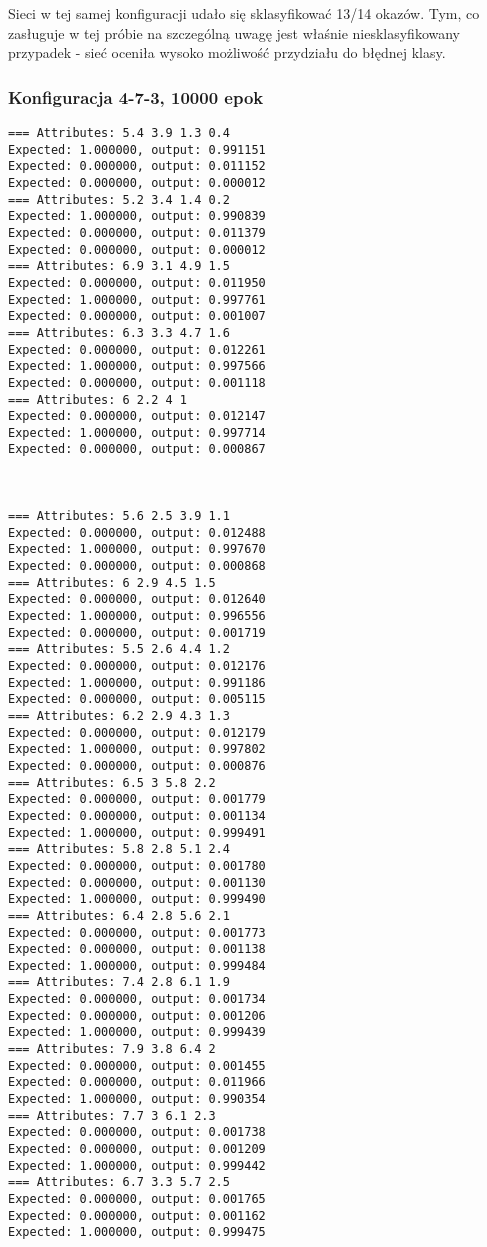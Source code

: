 \documentclass{classrep}
\begin{document}
Sieci w tej samej konfiguracji udało się sklasyfikować 13/14 okazów. Tym, co zasługuje w tej próbie na szczególną uwagę jest właśnie niesklasyfikowany przypadek - sieć oceniła wysoko możliwość przydziału do błędnej klasy.

\subsubsection{Konfiguracja 4-7-3, 10000 epok}
\begin{lstlisting}[basicstyle=\small]
=== Attributes: 5.4 3.9 1.3 0.4 
Expected: 1.000000, output: 0.991151
Expected: 0.000000, output: 0.011152
Expected: 0.000000, output: 0.000012
=== Attributes: 5.2 3.4 1.4 0.2 
Expected: 1.000000, output: 0.990839
Expected: 0.000000, output: 0.011379
Expected: 0.000000, output: 0.000012
=== Attributes: 6.9 3.1 4.9 1.5 
Expected: 0.000000, output: 0.011950
Expected: 1.000000, output: 0.997761
Expected: 0.000000, output: 0.001007
=== Attributes: 6.3 3.3 4.7 1.6 
Expected: 0.000000, output: 0.012261
Expected: 1.000000, output: 0.997566
Expected: 0.000000, output: 0.001118
=== Attributes: 6 2.2 4 1 
Expected: 0.000000, output: 0.012147
Expected: 1.000000, output: 0.997714
Expected: 0.000000, output: 0.000867



=== Attributes: 5.6 2.5 3.9 1.1 
Expected: 0.000000, output: 0.012488
Expected: 1.000000, output: 0.997670
Expected: 0.000000, output: 0.000868
=== Attributes: 6 2.9 4.5 1.5 
Expected: 0.000000, output: 0.012640
Expected: 1.000000, output: 0.996556
Expected: 0.000000, output: 0.001719
=== Attributes: 5.5 2.6 4.4 1.2 
Expected: 0.000000, output: 0.012176
Expected: 1.000000, output: 0.991186
Expected: 0.000000, output: 0.005115
=== Attributes: 6.2 2.9 4.3 1.3 
Expected: 0.000000, output: 0.012179
Expected: 1.000000, output: 0.997802
Expected: 0.000000, output: 0.000876
=== Attributes: 6.5 3 5.8 2.2 
Expected: 0.000000, output: 0.001779
Expected: 0.000000, output: 0.001134
Expected: 1.000000, output: 0.999491
=== Attributes: 5.8 2.8 5.1 2.4 
Expected: 0.000000, output: 0.001780
Expected: 0.000000, output: 0.001130
Expected: 1.000000, output: 0.999490
=== Attributes: 6.4 2.8 5.6 2.1 
Expected: 0.000000, output: 0.001773
Expected: 0.000000, output: 0.001138
Expected: 1.000000, output: 0.999484
=== Attributes: 7.4 2.8 6.1 1.9 
Expected: 0.000000, output: 0.001734
Expected: 0.000000, output: 0.001206
Expected: 1.000000, output: 0.999439
=== Attributes: 7.9 3.8 6.4 2 
Expected: 0.000000, output: 0.001455
Expected: 0.000000, output: 0.011966
Expected: 1.000000, output: 0.990354
=== Attributes: 7.7 3 6.1 2.3 
Expected: 0.000000, output: 0.001738
Expected: 0.000000, output: 0.001209
Expected: 1.000000, output: 0.999442
=== Attributes: 6.7 3.3 5.7 2.5 
Expected: 0.000000, output: 0.001765
Expected: 0.000000, output: 0.001162
Expected: 1.000000, output: 0.999475
\end{lstlisting}
\end{document}
